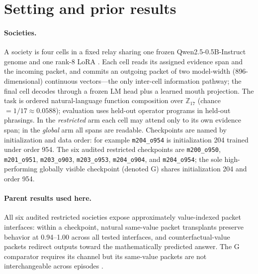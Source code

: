 \documentclass[11pt]{article}
\newcommand{\ckpt}[1]{\texttt{#1}}
\begin{document}
\section{Setting and prior results}\label{sec:setting}

\paragraph{Societies.} A society is four cells in a fixed relay sharing one frozen Qwen2.5-0.5B-Instruct genome \citep{qwen25} and one rank-8 LoRA \citep{hu2022lora}. Each cell reads its assigned evidence span and the incoming packet, and commits an outgoing packet of two model-width (896-dimensional) continuous vectors---the only inter-cell information pathway; the final cell decodes through a frozen LM head plus a learned mouth projection. The task is ordered natural-language function composition over $\mathbb{Z}_{17}$ (chance $=1/17\approx0.0588$); evaluation uses held-out operator programs in held-out phrasings. In the \emph{restricted} arm each cell may attend only to its own evidence span; in the \emph{global} arm all spans are readable. Checkpoints are named by initialization and data order: for example \ckpt{m204\_o954} is initialization 204 trained under order 954. The six audited restricted checkpoints are \ckpt{m200\_o950}, \ckpt{m201\_o951}, \ckpt{m203\_o903}, \ckpt{m203\_o953}, \ckpt{m204\_o904}, and \ckpt{m204\_o954}; the sole high-performing globally visible checkpoint (denoted G) shares initialization 204 and order 954.

\paragraph{Parent results used here.} All six audited restricted societies expose approximately value-indexed packet interfaces: within a checkpoint, natural same-value packet transplants preserve behavior at 0.94--1.00 across all tested interfaces, and counterfactual-value packets redirect outputs toward the mathematically predicted answer. The G comparator requires its channel but its same-value packets are not interchangeable across episodes \citep{marincat2026populus}.
\end{document}

